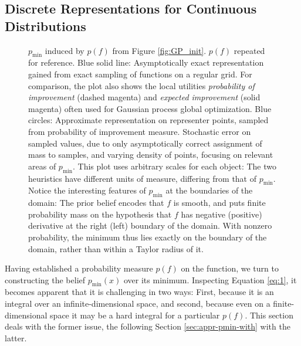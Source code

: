 \documentclass[twoside,11pt]{article}
\newcommand{\pmin}{p_{\min}}
\newcommand{\inputTikZ}[1]{%
 }
\newcommand{\inputTikZ}[1]{%
   \beginpgfgraphicnamed{#1-external}%
   \endpgfgraphicnamed%
 }
\begin{document}
\subsection{Discrete Representations for Continuous Distributions}
\label{sec:discr-repr-cont}
\begin{figure}
  \centering
  \inputTikZ{figures/pmin}
  \caption{$\pmin$ induced by $p(f)$ from Figure \ref{fig:GP_init}.
    $p(f)$ repeated for reference. Blue solid line: Asymptotically
    exact representation gained from exact sampling of functions on a
    regular grid. For comparison, the plot also shows the local
    utilities \emph{probability of improvement} (dashed magenta) and
    \emph{expected improvement} (solid magenta) often used for
    Gaussian process global optimization. Blue circles: Approximate
    representation on representer points, sampled from probability of
    improvement measure. Stochastic error on sampled values, due to
    only asymptotically correct assignment of mass to samples, and
    varying density of points, focusing on relevant areas of
    $\pmin$. This plot uses arbitrary scales for each object: The two
    heuristics have different units of measure, differing from that of
    $\pmin$. Notice the interesting features of $\pmin$ at the
    boundaries of the domain: The prior belief encodes that $f$ is
    smooth, and puts finite probability mass on the hypothesis that
    $f$ has negative (positive) derivative at the right (left)
    boundary of the domain. With nonzero probability, the minimum thus
    lies exactly on the boundary of the domain, rather than within a
    Taylor radius of it.}
  \label{fig:samples}
\end{figure}

Having established a probability measure $p(f)$ on the function, we
turn to constructing the belief $\pmin(x)$ over its
minimum. Inspecting Equation \eqref{eq:1}, it becomes apparent that it
is challenging in two ways: First, because it is an integral over an
infinite-dimensional space, and second, because even on a
finite-dimensional space it may be a hard integral for a particular
$p(f)$. This section deals with the former issue, the following
Section \ref{sec:appr-pmin-with} with the latter.
\end{document}
